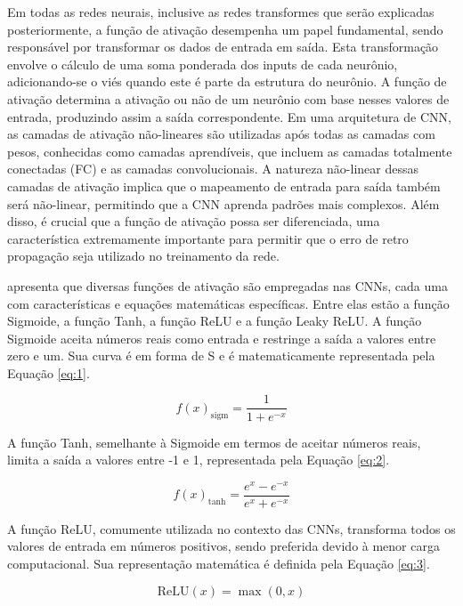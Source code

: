 Em todas as redes neurais, inclusive as redes transformes que serão explicadas posteriormente, a função de ativação desempenha um papel fundamental, sendo responsável por transformar os dados de entrada em saída. Esta transformação envolve o cálculo de uma soma ponderada dos inputs de cada neurônio, adicionando-se o viés quando este é parte da estrutura do neurônio. A função de ativação determina a ativação ou não de um neurônio com base nesses valores de entrada, produzindo assim a saída correspondente. Em uma arquitetura de CNN, as camadas de ativação não-lineares são utilizadas após todas as camadas com pesos, conhecidas como camadas aprendíveis, que incluem as camadas totalmente conectadas (FC) e as camadas convolucionais. A natureza não-linear dessas camadas de ativação implica que o mapeamento de entrada para saída também será não-linear, permitindo que a CNN aprenda padrões mais complexos. Além disso, é crucial que a função de ativação possa ser diferenciada, uma característica extremamente importante para permitir que o erro de retro propagação seja utilizado no treinamento da rede.

\textcite{Alzubaidi2021} apresenta que diversas funções de ativação são empregadas nas CNNs, cada uma com características e equações matemáticas específicas. Entre elas estão a função Sigmoide, a função Tanh, a função ReLU e a função Leaky ReLU. A função Sigmoide aceita números reais como entrada e restringe a saída a valores entre zero e um. Sua curva é em forma de S e é matematicamente representada pela Equação \ref{eq:1}.

\begin{equation}
f(x)_{\text{sigm}} = \frac{1}{1 + e^{-x}}
\label{eq:1}
\end{equation}

A função Tanh, semelhante à Sigmoide em termos de aceitar números reais, limita a saída a valores entre -1 e 1, representada pela Equação \ref{eq:2}.

\begin{equation}
f(x)_{\text{tanh}} = \frac{e^x - e^{-x}}{e^x + e^{-x}}
\label{eq:2}
\end{equation}

A função ReLU, comumente utilizada no contexto das CNNs, transforma todos os valores de entrada em números positivos, sendo preferida devido à menor carga computacional. Sua representação matemática é definida pela Equação \ref{eq:3}.

\begin{equation}
\text{ReLU}(x) = \max(0, x)
\label{eq:3
}
\end{equation}

